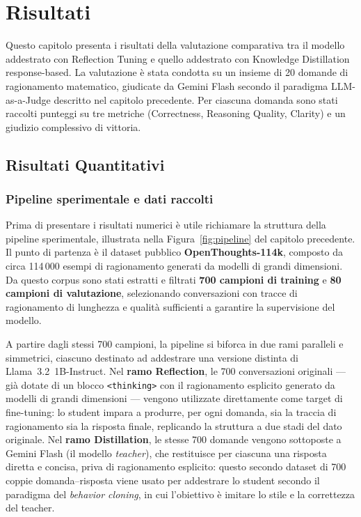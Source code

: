 \chapter{Risultati}
\label{cap:4}

Questo capitolo presenta i risultati della valutazione comparativa tra
il modello addestrato con Reflection Tuning e quello addestrato con
Knowledge Distillation response-based. La valutazione è stata condotta
su un insieme di 20 domande di ragionamento matematico, giudicate
da Gemini Flash secondo il paradigma LLM-as-a-Judge descritto nel
capitolo precedente. Per ciascuna domanda sono stati raccolti punteggi
su tre metriche (Correctness, Reasoning Quality, Clarity) e un
giudizio complessivo di vittoria.


\section{Risultati Quantitativi}
\label{sec:risultati_quantitativi}

\subsection{Pipeline sperimentale e dati raccolti}
\label{subsec:pipeline_risultati}

Prima di presentare i risultati numerici è utile richiamare la
struttura della pipeline sperimentale, illustrata nella
Figura~\ref{fig:pipeline} del capitolo precedente.
Il punto di partenza è il dataset pubblico \textbf{OpenThoughts-114k},
composto da circa 114\,000 esempi di ragionamento generati da modelli
di grandi dimensioni. Da questo corpus sono stati estratti e filtrati
\textbf{700 campioni di training} e \textbf{80 campioni di valutazione},
selezionando conversazioni con tracce di ragionamento di lunghezza e
qualità sufficienti a garantire la supervisione del modello.

A partire dagli stessi 700 campioni, la pipeline si biforca in due
rami paralleli e simmetrici, ciascuno destinato ad addestrare una
versione distinta di Llama~3.2~1B-Instruct. Nel \textbf{ramo
Reflection}, le 700 conversazioni originali --- già dotate di un
blocco \texttt{<thinking>} con il ragionamento esplicito generato
da modelli di grandi dimensioni --- vengono utilizzate direttamente
come target di fine-tuning: lo student impara a produrre, per ogni
domanda, sia la traccia di ragionamento sia la risposta finale,
replicando la struttura a due stadi del dato originale. Nel \textbf{ramo
Distillation}, le stesse 700 domande vengono sottoposte a Gemini
Flash (il modello \emph{teacher}), che restituisce per ciascuna una
risposta diretta e concisa, priva di ragionamento esplicito: questo
secondo dataset di 700 coppie domanda--risposta viene usato per
addestrare lo student secondo il paradigma del \emph{behavior cloning},
in cui l'obiettivo è imitare lo stile e la correttezza del teacher.

